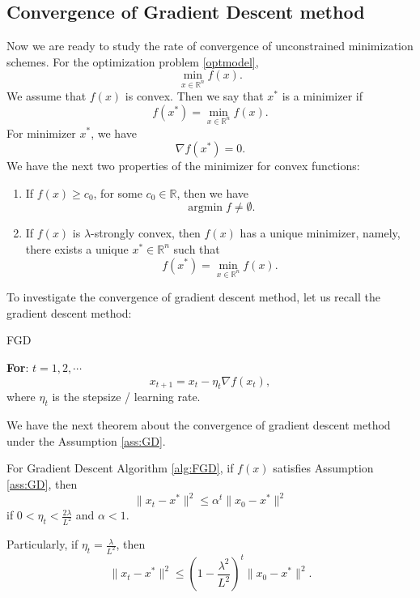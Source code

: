 \subsection{Convergence of Gradient Descent method}
Now we are ready to study the rate of convergence of unconstrained minimization schemes. 
For the optimization problem \eqref{optmodel},
\begin{equation}\label{key}
\min_{x\in \mathbb{R}^n} f(x).
\end{equation}
We assume that $f(x)$ is convex.
Then we say that $x^*$ is a minimizer if 
$$
f(x^*) = \min_{x \in \mathbb{R}^n} f(x).
$$
For minimizer $x^*$, we have
\begin{equation}\label{key}
\nabla f(x^*) = 0.
\end{equation}
We have the next two properties of the minimizer for convex functions:
\begin{enumerate}
	\item If $f(x) \ge c_0$, for some $c_0 \in \mathbb{R}$, then we have 
	\begin{equation}\label{key}
	\mathop{\arg\min} f \neq \emptyset.
	\end{equation}
	\item If $f(x)$ is $\lambda$-strongly convex, then $f(x)$ has a unique minimizer, namely, there
	exists a unique $x^*\in \mathbb{R}^n$ such that 
	\begin{equation}\label{key}
	f(x^*) = \min_{x\in \mathbb{R}^n }f(x).
	\end{equation}
\end{enumerate}


To investigate the convergence of gradient descent method, let us recall the gradient
descent method:
\begin{algorithm}
	\caption{ FGD} 
	\label{alg:FGD}
	{\bf For}: $t = 1, 2, \cdots$
	\begin{equation}\label{equ:fgd-iteration}
	x_{t+1} =  x_{t} - \eta_t \nabla f(x_t), 
	\end{equation}
	where $\eta_t$ is the stepsize / learning rate.
\end{algorithm}




We have the next theorem about the convergence of gradient descent method under the Assumption
\ref{ass:GD}.

\begin{theorem}
	For Gradient Descent Algorithm \ref{alg:FGD}, if $f(x)$ satisfies Assumption \ref{ass:GD}, then 
	\begin{equation}
	\|x_t - x^*\|^2 \le  \alpha^t \|x_0 - x^*\|^2
	\end{equation}
	if $0<\eta_t <\frac{2\lambda}{L^2}$ and $\alpha < 1$. 
	
	Particularly, if $\eta_t = \frac{\lambda}{L^2}$, then
	\begin{equation}
	\|x_t - x^*\|^2 \le  \left(1 - \frac{\lambda^2}{L^2}\right)^t \|x_0 - x^*\|^2.
	\end{equation} 
\end{theorem}

